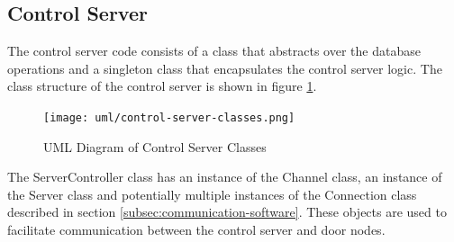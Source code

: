 \subsection{Control Server}

The control server code consists of a class that abstracts over the database
operations and a singleton class that encapsulates the control server logic. The
class structure of the control server is shown in figure
\ref{fig:control-server-classes}.

\begin{figure}[!htb]
\centering
\texttt{[image: uml/control-server-classes.png]}
\caption{UML Diagram of Control Server Classes}
\label{fig:control-server-classes}
\end{figure}

The ServerController class has an instance of the Channel class, an instance
of the Server class and potentially multiple instances of the Connection class
described in section \ref{subsec:communication-software}. These objects are used
to facilitate communication between the control server and door nodes.

